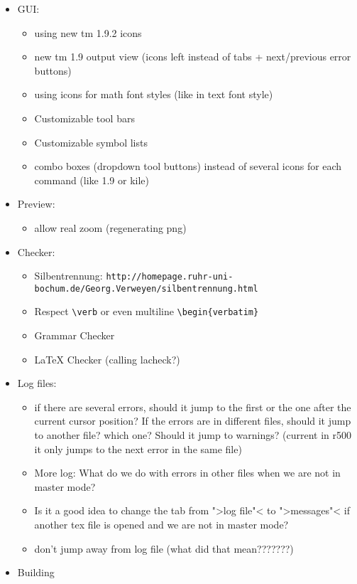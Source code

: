 \documentclass[10pt,a4paper,landscape]{report}
\begin{document}
\begin{itemize}
\begin{itemize}
	\end{itemize}
	\item GUI: \begin{itemize}
		\item using new tm 1.9.2 icons
		\item new tm 1.9 output view (icons left instead of tabs + next/previous error buttons)
		\item using icons for math font styles (like in text font style)
		\item Customizable tool bars
		\item Customizable symbol lists
		\item combo boxes (dropdown tool buttons) instead of several icons for each command (like 1.9 or kile)
	\end{itemize}
	\item Preview: \begin{itemize}
		\item allow real zoom (regenerating png)
	\end{itemize}
	\item  Checker: \begin{itemize}
		\item Silbentrennung: \verb+http://homepage.ruhr-uni-bochum.de/Georg.Verweyen/silbentrennung.html+
		\item Respect \verb+\verb+ or even multiline \verb+\begin{verbatim}+
		\item Grammar Checker
		\item LaTeX Checker	(calling lacheck?)
	\end{itemize}
	\item Log files:\begin{itemize}
	\item if there are several errors, should it jump to the first or the one after the current cursor position? If the errors are in different files, should it jump to another file? which one? Should it jump to warnings? 	(current in r500 it only jumps to the next error in the same file) 
		\item More log: What do we do with errors in other files when we are not in master mode? 
		\item Is it a good idea to change the tab from ">log file"< to ">messages"< if another tex file is opened and we are not in master mode?
		\item don't jump away from log file (what did that mean???????)
	\end{itemize}
	\item Building \begin{itemize}

\end{itemize}
\end{itemize}
\end{document}
